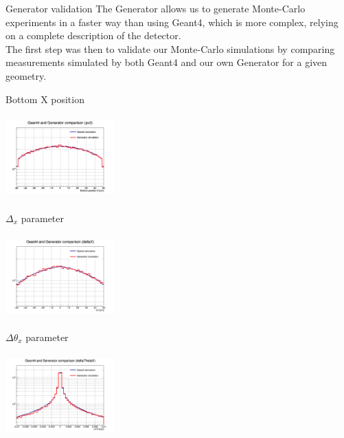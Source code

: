 \documentclass[8 pt]{beamer}
\begin{document}
\begin{frame}{Generator validation}
\justifying
The Generator allows us to generate Monte-Carlo experiments in a faster way than using Geant4, which is more complex, relying on a complete description of the detector. \\ \vspace{10pt}
The first step was then to validate our Monte-Carlo simulations by comparing measurements simulated by both Geant4 and our own Generator for a given geometry. \vfill

\begin{minipage}[c]{.32\textwidth}
\begin{exampleblock}{} \begin{center}Bottom X position\end{center} \end{exampleblock}
\includegraphics[width=4.2cm, height=3.2cm]{figs/px2-17p2vs17p2.png} 
\end{minipage}
\begin{minipage}[c]{.32\textwidth}
\begin{exampleblock}{} \begin{center}$\Delta_x$ parameter\end{center} \end{exampleblock}
\includegraphics[width=4.2cm, height=3.2cm]{figs/deltaX-17p2vs17p2.png}
\end{minipage}
\begin{minipage}[c]{.32\textwidth}
\begin{exampleblock}{} \begin{center}$\Delta \theta_x$ parameter\end{center} \end{exampleblock}
\includegraphics[width=4.2cm, height=3.2cm]{figs/deltaThetaX-17p2vs17p2.png}
\end{minipage}

\end{frame}
\end{document}
